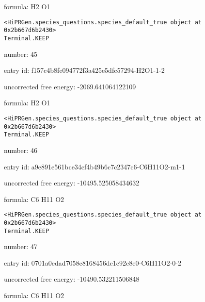 \documentclass{article}
\begin{document}
formula: H2 O1


\vspace{1cm}
\begin{verbatim}
<HiPRGen.species_questions.species_default_true object at 0x2b667d6b2430>
Terminal.KEEP
\end{verbatim}


number: 45



entry id: f157c4b8fe094772f3a425e5dfc57294-H2O1-1-2



uncorrected free energy: -2069.641064122109



formula: H2 O1


\vspace{1cm}
\begin{verbatim}
<HiPRGen.species_questions.species_default_true object at 0x2b667d6b2430>
Terminal.KEEP
\end{verbatim}


number: 46



entry id: a9e891e561bce34cf4b49b6c7c2347c6-C6H11O2-m1-1



uncorrected free energy: -10495.525058434632



formula: C6 H11 O2


\vspace{1cm}
\begin{verbatim}
<HiPRGen.species_questions.species_default_true object at 0x2b667d6b2430>
Terminal.KEEP
\end{verbatim}


number: 47



entry id: 0701a0edad7058c8168456de1c92e8e0-C6H11O2-0-2



uncorrected free energy: -10490.532211506848



formula: C6 H11 O2

\end{document}
